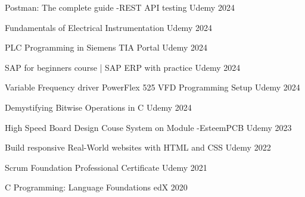 




\begin{cvhonors}


\cvhonor
{Postman: The complete guide -REST API testing} %
{} %
{Udemy} %
{2024} %


\cvhonor
{Fundamentals of Electrical Instrumentation} %
{} %
{Udemy} %
{2024} %


\cvhonor
{PLC Programming in Siemens TIA Portal} %
{} %
{Udemy} %
{2024} %


\cvhonor
{SAP for beginners course | SAP ERP with practice} %
{} %
{Udemy} %
{2024} %

\cvhonor
{Variable Frequency driver PowerFlex 525 VFD Programming Setup} %
{} %
{Udemy} %
{2024} %

\cvhonor
{Demystifying Bitwise Operations in C} %
{} %
{Udemy} %
{2024} %

\cvhonor
{High Speed Board Design Couse System on Module -EsteemPCB} %
{} %
{Udemy} %
{2023} %

\cvhonor
{Build responsive Real-World websites with HTML and CSS} %
{} %
{Udemy} %
{2022} %

\cvhonor
{Scrum Foundation Professional Certificate} %
{} %
{Udemy} %
{2021} %

\cvhonor
{C Programming: Language Foundations} %
{} %
{edX} %
{2020} %


\end{cvhonors}
